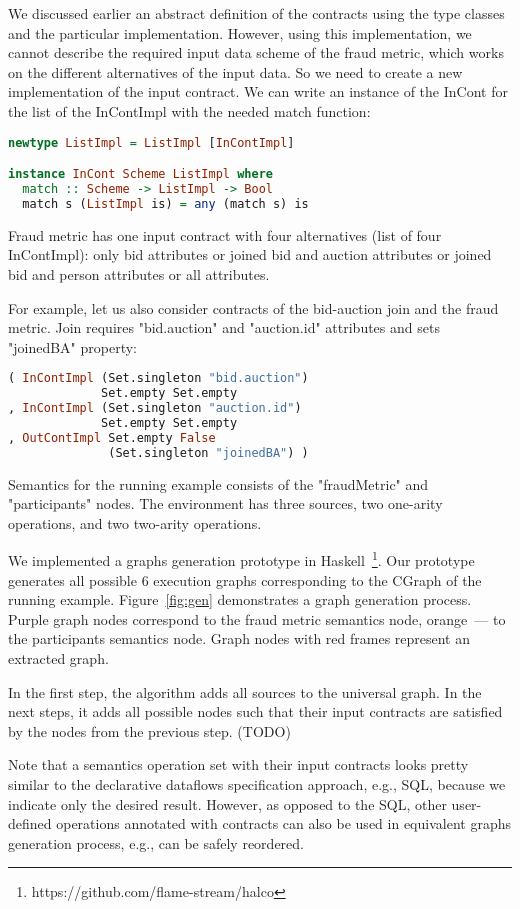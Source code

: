 We discussed earlier an abstract definition of the contracts using the type classes and the particular implementation.
However, using this implementation, we cannot describe the required input data scheme of the fraud metric, which works on the different alternatives of the input data.
So we need to create a new implementation of the input contract.
We can write an instance of the InCont for the list of the InContImpl with the needed match function:

\begin{lstlisting}[language=Haskell]
newtype ListImpl = ListImpl [InContImpl]

instance InCont Scheme ListImpl where
  match :: Scheme -> ListImpl -> Bool
  match s (ListImpl is) = any (match s) is
\end{lstlisting}

Fraud metric has one input contract with four alternatives (list of four InContImpl):
only bid attributes
or joined bid and auction attributes
or joined bid and person attributes
or all attributes.

For example, let us also consider contracts of the bid-auction join and the fraud metric.
Join requires "bid.auction" and "auction.id" attributes and sets "joinedBA" property:
\begin{lstlisting}[language=Haskell]
( InContImpl (Set.singleton "bid.auction")
             Set.empty Set.empty
, InContImpl (Set.singleton "auction.id")
             Set.empty Set.empty
, OutContImpl Set.empty False
              (Set.singleton "joinedBA") )
\end{lstlisting}

Semantics for the running example consists of the "fraudMetric" and "participants" nodes.
The environment has three sources, two one-arity operations, and two two-arity operations.

We implemented a graphs generation prototype in Haskell~\footnote{https://github.com/flame-stream/halco}.
Our prototype generates all possible 6 execution graphs corresponding to the CGraph of the running example. Figure~\ref{fig:gen} demonstrates a graph generation process.
Purple graph nodes correspond to the fraud metric semantics node, orange~--- to the participants semantics node.
Graph nodes with red frames represent an extracted graph.

In the first step, the algorithm adds all sources to the universal graph.
In the next steps, it adds all possible nodes such that their input contracts are satisfied by the nodes from the previous step. (TODO)

Note that a semantics operation set with their input contracts looks pretty similar to the declarative dataflows specification approach, e.g., SQL, because we indicate only the desired result.
However, as opposed to the SQL, other user-defined operations annotated with contracts can also be used in equivalent graphs generation process, e.g., can be safely reordered.

